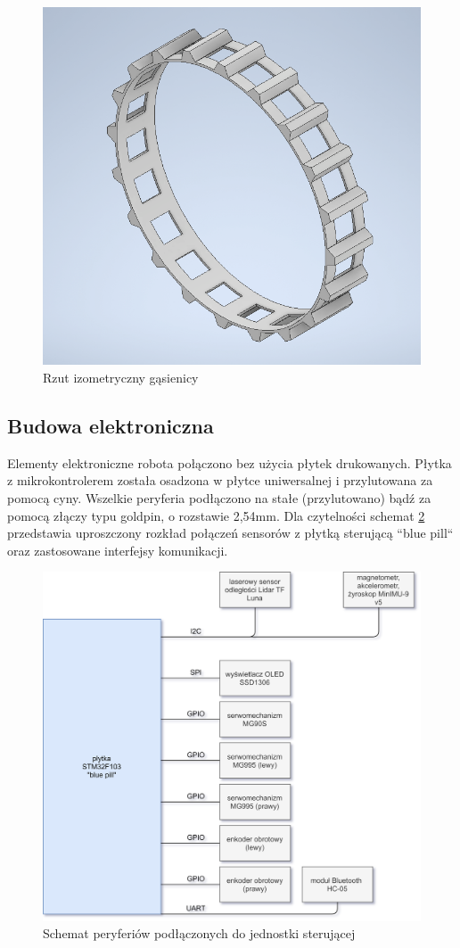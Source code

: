 \begin{figure}[H]
	\centering
		\includegraphics[width=0.6\linewidth]{rys/tracks-final.png}
	\caption{Rzut izometryczny gąsienicy}
	\label{fig:tracks}
\end{figure}


\subsection{Budowa elektroniczna}

Elementy elektroniczne robota połączono bez użycia płytek drukowanych. Płytka z mikrokontrolerem została osadzona w płytce uniwersalnej i przylutowana za pomocą cyny. Wszelkie peryferia podłączono na stałe (przylutowano) bądź za pomocą złączy typu goldpin, o rozstawie 2,54mm. Dla czytelności schemat \ref{fig:electronic-schematic-simplified} przedstawia uproszczony rozkład połączeń sensorów z płytką sterującą ``blue pill`` oraz zastosowane interfejsy komunikacji.

\begin{figure}[ht]
	\centering
		\includegraphics[width=1\linewidth]{rys/electronic-schematic.png}
	\caption{Schemat peryferiów podłączonych do jednostki sterującej}
	\label{fig:electronic-schematic-simplified}
\end{figure}

